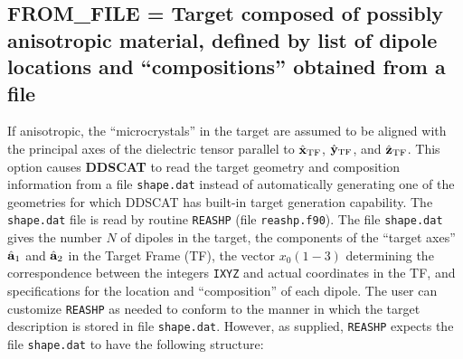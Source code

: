 \subsection{ FROM\_FILE = Target composed of possibly anisotropic material,
            defined by list of dipole locations and ``compositions'' 
	    obtained from a file
            \label{sec:FROM_FILE}}
        If anisotropic, the ``microcrystals'' in the target are assumed
	to be aligned with the principal axes of the dielectric tensor
	parallel to $\hat{\bf x}_{\rm TF}$, $\hat{\bf y}_{\rm TF}$, and $\hat{\bf z}_{\rm TF}$.
        This option causes {{\bf DDSCAT}} to read the target geometry
	and composition information from a file {\tt shape.dat}
	instead of automatically generating one of the geometries for
	which DDSCAT has built-in target generation capability.
	The {\tt shape.dat} file is read by routine {\tt REASHP}
	(file {\tt reashp.f90}).
	The file {\tt shape.dat} gives the number $N$ of dipoles in the
	target, the components of the 
	``target axes'' $\hat{\bf a}_1$ and $\hat{\bf a}_2$ in
	the Target Frame (TF), the vector $x_0(1-3)$ determining the
	correspondence between the integers {\tt IXYZ} and
	actual coordinates in the TF, and specifications for the
	location and ``composition'' of each dipole.
	The user can customize {\tt REASHP} as needed to conform to the
	manner in which the target description is stored in file
	{\tt shape.dat}.
	However, as supplied, {\tt REASHP} expects the file {\tt shape.dat}
	to have the following structure:
